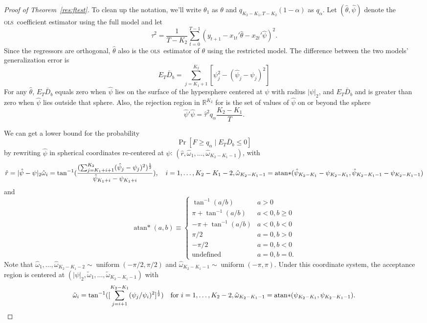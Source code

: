\documentclass[11pt]{article}
\DeclareMathOperator{\atan}{atan*}
\newcommand{\oosB}{\bar{D}_b}
\newcommand{\ols}{\textsc{ols}}
\renewcommand{\Re}{\ensuremath{\mathbb{R}}}
\begin{document}
\begin{proof}[Proof of Theorem~\ref{res:ftest}]
  To clean up the notation, we'll write $\theta_1$ as $\theta$ and
  $q_{K_2-K_1,T-K_2}(1-\alpha)$ as $q_\alpha$.  Let
  $(\hat{\theta}, \hat{\psi})$ denote the \ols\ coefficient estimator
  using the full model and let 
  \[\hat\tau^2 = \frac{1}{T-K_2}\sum_{t=0}^{T-1} (y_{t+1} - x_{1t}'\hat{\theta} -
  x_{2t}'\hat{\psi})^2. \] Since the regressors are orthogonal,
  $\hat\theta$ also is the \ols\ estimator of $\theta$ using the
  restricted model.  The difference between the two models'
  generalization error is
\[
E_T \oosB = \sum_{j=K_1+1}^{K_2} [\psi_j^2 - (\hat{\psi}_j - \psi_j)^2]
\]
For any $\hat{\theta}$, $E_T \oosB$ equals zero when
$\hat{\psi}$ lies on the surface of the hypersphere centered at
$\psi$ with radius $|\psi|_2$, and $E_T \oosB$ and is greater
than zero when $\hat{\psi}$ lies outside that sphere.
Also, the rejection region in $\Re^{K_2}$ for is the set of values of $\hat{\psi}$
on or beyond the sphere
\[
\hat{\psi}'\hat{\psi} = \hat{\tau}^2 q_\alpha \frac{K_2-K_1}{T}.
\]

We can get a lower bound for the probability
\[\Pr[F \geq q_\alpha \mid E_T \oosB \leq 0]\]
by rewriting $\hat{\psi}$ in spherical coordinates re-centered at
$\psi$: $(\hat{r}, \hat{\omega}_1, \dots,
\hat{\omega}_{K_2-K_1-1})$, with 
\[\hat{r} = |\hat{\psi} - \psi|_2 \\
\hat{\omega}_{i} = \tan^{-1}(\frac{(\sum\nolimits_{j=K_1+i+1}^{K_2}(\hat{\psi}_j -
    \psi_j)^2)^{\frac12}}{\hat{\psi}_{K_1+i} - \psi_{K_1+i}}), \quad
  i=1,\dots,K_2-K_1-2, \\
\hat{\omega}_{K_2-K_1-1} =\atan(\hat{\psi}_{K_2-K_1} - \psi_{K_2-K_1},
  \hat{\psi}_{K_2-K_1-1}- \psi_{K_2-K_1-1} )
\]
and
\[
\atan(a, b) \equiv 
\begin{cases}
\tan^{-1}(a/b) & a > 0 \\
\pi + \tan^{-1}(a/b) & a < 0, b \geq 0 \\
-\pi + \tan^{-1}(a/b) & a < 0, b < 0 \\
\pi/2 & a = 0, b > 0 \\
- \pi/2 & a = 0, b < 0 \\
\text{undefined} & a = 0, b = 0.
\end{cases}
\]
Note that $\hat{\omega}_1,\dots,\hat{\omega}_{K_2-K_1 - 2} \sim
\operatorname{uniform}(-\pi/2, \pi/2)$ and
$\hat{\omega}_{K_2-K_1-1}\sim \operatorname{uniform}(-\pi, \pi)$.
Under this coordinate system, the acceptance region is centered at
$(|\psi|_2, \tilde{\omega}_1, \dots, \tilde{\omega}_{K_2-K_1-1})$ with
\[
\tilde{\omega}_i = \tan^{-1}([\sum_{j=i+1}^{K_2-K_1}
  (\psi_j/\psi_i)^2]^{\frac12}) \quad \text{for } i = 1,\dots,K_2-2,\\
\tilde{\omega}_{K_2-K_1-1} = \atan(\psi_{K_2-K_1}, \psi_{K_2-K_1-1}).
\]


\end{proof}
\end{document}
